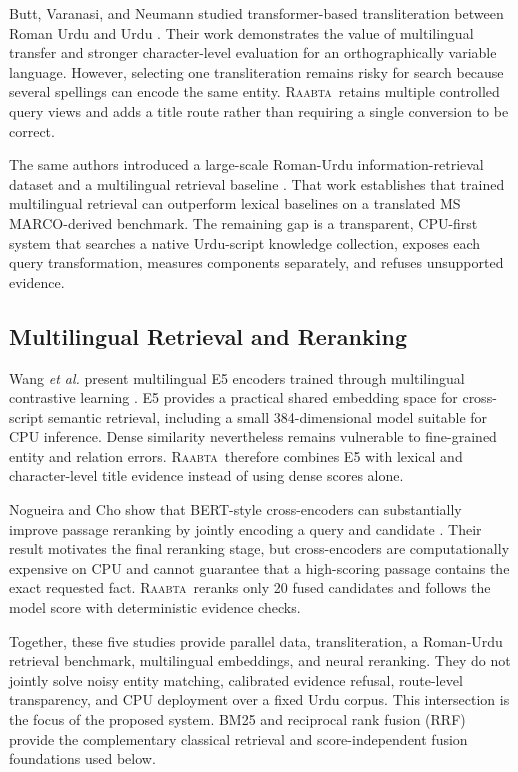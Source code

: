 \documentclass[conference]{IEEEtran}
\newcommand{\system}{\textsc{Raabta}}
\begin{document}
Butt, Varanasi, and Neumann studied transformer-based transliteration between Roman Urdu and Urdu \cite{butt2025translit}. Their work demonstrates the value of multilingual transfer and stronger character-level evaluation for an orthographically variable language. However, selecting one transliteration remains risky for search because several spellings can encode the same entity. \system\ retains multiple controlled query views and adds a title route rather than requiring a single conversion to be correct.

The same authors introduced a large-scale Roman-Urdu information-retrieval dataset and a multilingual retrieval baseline \cite{butt2025ir}. That work establishes that trained multilingual retrieval can outperform lexical baselines on a translated MS MARCO-derived benchmark. The remaining gap is a transparent, CPU-first system that searches a native Urdu-script knowledge collection, exposes each query transformation, measures components separately, and refuses unsupported evidence.

\subsection{Multilingual Retrieval and Reranking}
Wang \emph{et al.} present multilingual E5 encoders trained through multilingual contrastive learning \cite{wang2024e5}. E5 provides a practical shared embedding space for cross-script semantic retrieval, including a small 384-dimensional model suitable for CPU inference. Dense similarity nevertheless remains vulnerable to fine-grained entity and relation errors. \system\ therefore combines E5 with lexical and character-level title evidence instead of using dense scores alone.

Nogueira and Cho show that BERT-style cross-encoders can substantially improve passage reranking by jointly encoding a query and candidate \cite{nogueira2019bert}. Their result motivates the final reranking stage, but cross-encoders are computationally expensive on CPU and cannot guarantee that a high-scoring passage contains the exact requested fact. \system\ reranks only 20 fused candidates and follows the model score with deterministic evidence checks.

Together, these five studies provide parallel data, transliteration, a Roman-Urdu retrieval benchmark, multilingual embeddings, and neural reranking. They do not jointly solve noisy entity matching, calibrated evidence refusal, route-level transparency, and CPU deployment over a fixed Urdu corpus. This intersection is the focus of the proposed system. BM25 \cite{robertson2009bm25} and reciprocal rank fusion (RRF) \cite{cormack2009rrf} provide the complementary classical retrieval and score-independent fusion foundations used below.
\end{document}
